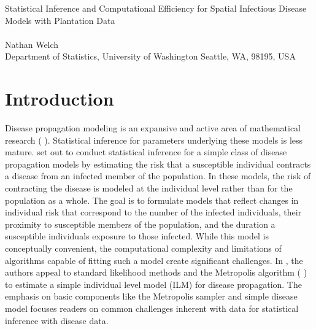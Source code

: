 \documentclass{uwstat572}
\newcommand{\vmadd}[1]{\textbf{\color{red}{#1}}}
\newcommand{\vmcomment}[1]{({\color{blue}{VM's comment:}} \textbf{\color{blue}{#1}})}
\begin{document}

\begin{center}
  {\LARGE Statistical Inference and Computational Efficiency for Spatial Infectious Disease Models with Plantation Data}\\\ \\
  {Nathan Welch \\ 
    Department of Statistics, University of Washington Seattle, WA, 98195, USA
  }
\end{center}

\begin{abstract}
This report examines the findings published in \textit{Statistical inference and computational efficiency for spatial infectious disease models with plantation data} \citet{Brown}. 
This paper aims to conduct statistical inference for parameters associated with a simple individual level infectious disease model. 
Model parameters are estimated using the Metropolis sampling algorithm; however, the computation burden created by fitting even a simple model leads to prohibitively long computation time. 
Statistical and computational methods to overcome the computing challenge are reviewed as a result. 
\vmcomment{Mention why this statistical problem is important in the abstract}
\end{abstract}

\section{Introduction}

Disease propagation modeling is an expansive and active area of mathematical research \vmcomment{add reference}.
Statistical inference for parameters underlying these models is less mature.
\vmadd{\citet{Brown}} set out to conduct statistical inference for a simple class of disease propagation models by estimating the risk that a susceptible individual contracts a disease from an infected member of the population. 
In these models, the risk of contracting the disease is modeled at the individual level rather than for the population as a whole. 
The goal is to formulate models that reflect changes in individual risk that correspond to the number of the infected individuals, their proximity to susceptible members of the population, and the duration a susceptible individuals  exposure to those infected. 
While this model is conceptually convenient, the computational complexity and limitations of algorithms capable of fitting such a model create significant challenges.
In \citep{Brown}, the authors appeal to standard likelihood methods and the Metropolis algorithm \vmcomment{add Metropolis et al.\ reference} to estimate \vmadd{parameters of} a simple individual level model (ILM) for disease propagation.
The emphasis on basic components like the Metropolis sampler and simple disease model focuses readers on common challenges inherent with data for statistical inference with \vmadd{infectious} disease data. 
\end{document}
